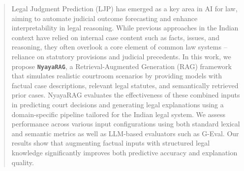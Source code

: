 \begin{abstract}
Legal Judgment Prediction (LJP) has emerged as a key area in AI for law, aiming to automate judicial outcome forecasting and enhance interpretability in legal reasoning. While previous approaches in the Indian context have relied on internal case content such as facts, issues, and reasoning, they often overlook a core element of common law systems -- reliance on statutory provisions and judicial precedents. In this work, we propose \textbf{\texttt{NyayaRAG}}, a Retrieval-Augmented Generation (RAG) framework that simulates realistic courtroom scenarios by providing models with factual case descriptions, relevant legal statutes, and semantically retrieved prior cases. NyayaRAG evaluates the effectiveness of these combined inputs in predicting court decisions and generating legal explanations using a domain-specific pipeline tailored for the Indian legal system. We assess performance across various input configurations using both standard lexical and semantic metrics as well as LLM-based evaluators such as G-Eval. Our results show that augmenting factual inputs with structured legal knowledge significantly improves both predictive accuracy and explanation quality.
\end{abstract}
